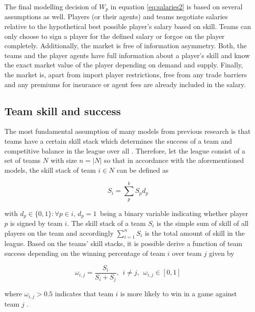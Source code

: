 \documentclass[12pt, a4paper]{article}
\begin{document}
\noindent
The final modelling decision of $W_p$ in equation \ref{eq:salaries2} is based on several assumptions as well. Players (or their agents) and teams negotiate salaries relative to the hypothetical best possible player's salary based on skill. Teams can only choose to sign a player for the defined salary or forgoe on the player completely. Additionally, the market is free of information asymmetry. Both, the teams and the player agents have full information about a player's skill and know the exact market value of the player depending on demand and supply. Finally, the market is, apart from import player restrictions, free from any trade barriers and any premiums for insurance or agent fees are already included in the salary.

\subsection{Team skill and success}
The most fundamental assumption of many models from previous research is that teams have a certain skill stack which determines the success of a team and competitive balance in the league over all \citep[see][]{dietl_effect_2009,dietl_effect_2010,dietl_salary_2012,dietl_competitive_2011,dietl_combined_2011,el-hodiri_economic_1971,fort_cross-subsidization_1995,kesenne_impact_2000,kesenne_optimal_2015,whitney_bidding_1993}. Therefore, let the league consist of a set of teams $N$ with size $n=|N|$ so that in accordance with the aforementioned models, the skill stack of team $i \in N$ can be defined as 

\begin{equation}
S_i=\sum_{p}^{k}S_pd_p
\end{equation}

\noindent
with $d_p \in \{0,1\}:\forall p \in i, \, d_p=1 \, $ being a binary variable indicating whether player $p$ is signed by team $i$. The skill stack of a team $S_i$ is the simple sum of skill of all players on the team and accordingly $\sum_{i=1}^{n}S_i$ is the total amount of skill in the league. Based on the teams' skill stacks, it is possible derive a function of team success depending on the winning percentage of team $i$ over team $j$ given by 

\begin{equation}
\label{eq:gameWinningPercentage}
\omega_{i,j}=\frac{S_i}{S_i+S_j},\ \ i\neq j,\ \ \omega_{i,j}\in[0,1]
\end{equation}

\noindent
where $\omega_{i,j}>0.5$ indicates that team $i$ is more likely to win in a game against team $j$ \citep[see][]{dietl_competitive_2011,dietl_combined_2011,fort_cross-subsidization_1995,kesenne_optimal_2015,rocaboy_performance_2020,whitney_bidding_1993}.
\end{document}
